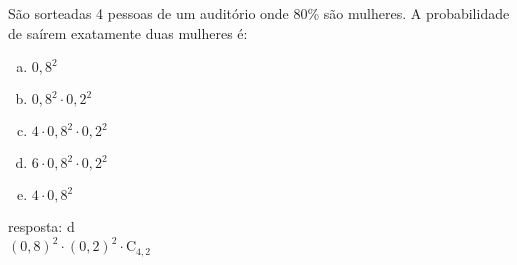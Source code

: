 \begin{ex}
 	São sorteadas 4 pessoas de um auditório onde 80\% são mulheres. A probabilidade de saírem exatamente duas mulheres é:
    \begin{enumerate}[(a)]
    \item $0,8^2$
    \item $0,8^2\cdot0,2^2$
    \item $4\cdot0,8^2\cdot0,2^2$
    \item $6\cdot0,8^2\cdot0,2^2$
    \item $4\cdot0,8^2$
    \end{enumerate}
       \begin{sol}
         resposta: d \\
         $(0,8)^2\cdot(0,2)^2\cdot\mathrm{C}_{4,2}$
       \end{sol}
\end{ex}
